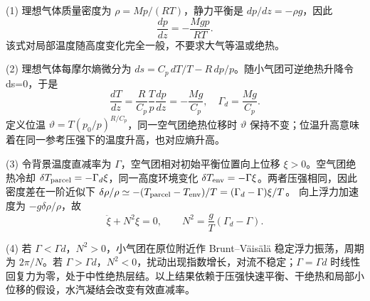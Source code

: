(1) 理想气体质量密度为 \(\rho=Mp/(RT)\)，静力平衡是 \(dp/dz=-\rho g\)，因此
\[
\frac{dp}{dz}=-\frac{Mgp}{RT}.
\]
该式对局部温度随高度变化完全一般，不要求大气等温或绝热。

(2) 理想气体每摩尔熵微分为 \(ds=C_p\,dT/T-R\,dp/p\)。随小气团可逆绝热升降令 ds=0，于是
\[
\frac{dT}{dz}=\frac{R}{C_p}\frac Tp\frac{dp}{dz}
=-\frac{Mg}{C_p},
\quad \Gamma_d=\frac{Mg}{C_p}.
\]
定义位温 \(\vartheta=T(p_0/p)^{R/C_p}\)，同一空气团绝热位移时 \(\vartheta\) 保持不变；位温升高意味着在同一参考压强下的温度升高，也对应熵升高。

(3) 令背景温度直减率为 \(\Gamma \)，空气团相对初始平衡位置向上位移 \(\xi >0\)。空气团绝热冷却 \(\delta T_{\rm parcel}=-\Gamma_d\xi\)，同一高度环境变化 \(\delta T_{\rm env}=-\Gamma\xi\)。两者压强相同，因此密度差在一阶近似下
\(\delta\rho/\rho\simeq-(T_{\rm parcel}-T_{\rm env})/T
=(\Gamma_d-\Gamma)\xi/T\)。
向上浮力加速度为 \(-g\delta\rho/\rho\)，故
\[
\ddot\xi+N^2\xi=0,\qquad N^2=\frac gT(\Gamma_d-\Gamma).
\]

(4) 若 \(\Gamma <\Gamma d\)，\(N^{2}>0\)，小气团在原位附近作 Brunt–Väisälä 稳定浮力振荡，周期为 \(2\pi/N\)。若 \(\Gamma >\Gamma d\)，\(N^{2}<0\)，扰动出现指数增长，对流不稳定；\(\Gamma =\Gamma d\) 时线性回复力为零，处于中性绝热层结。以上结果依赖于压强快速平衡、干绝热和局部小位移的假设，水汽凝结会改变有效直减率。
